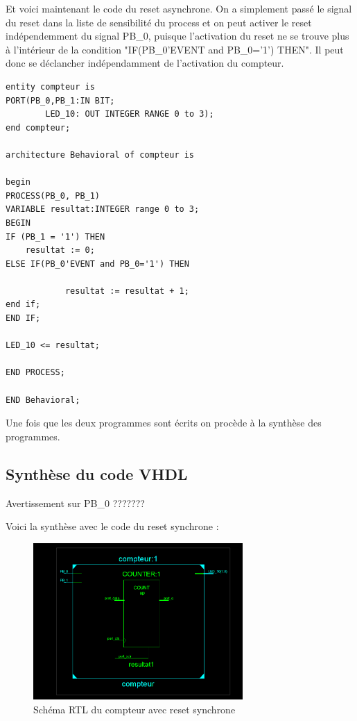\documentclass[11pt]{report}
\begin{document}
Et voici maintenant le code du reset asynchrone. On a simplement passé le signal du reset dans la liste de sensibilité du process et on peut activer le reset indépendemment du signal PB\_0, puisque l'activation du reset ne se trouve plus à l'intérieur de la condition "IF(PB\_0'EVENT and PB\_0='1') THEN". Il peut donc se déclancher indépendamment de l'activation du compteur. 


\begin{lstlisting}
entity compteur is
PORT(PB_0,PB_1:IN BIT;
		LED_10: OUT INTEGER RANGE 0 to 3);
end compteur;

architecture Behavioral of compteur is

begin
PROCESS(PB_0, PB_1)
VARIABLE resultat:INTEGER range 0 to 3;
BEGIN
IF (PB_1 = '1') THEN
	resultat := 0;
ELSE IF(PB_0'EVENT and PB_0='1') THEN

			resultat := resultat + 1;
end if;
END IF;

LED_10 <= resultat;

END PROCESS;

END Behavioral;

\end{lstlisting}

Une fois que les deux programmes sont écrits on procède à la synthèse des programmes. 

 \subsection{ Synthèse du code VHDL }
 
 Avertissement sur PB\_0 ???????
 
 Voici la synthèse avec le code du reset synchrone :

 \begin{figure}[h]
\begin{center}
\includegraphics[width=8cm]{TP02-3.PNG}
\caption{Schéma RTL du compteur avec reset synchrone}
\end{center}
\end{figure}
\end{document}
